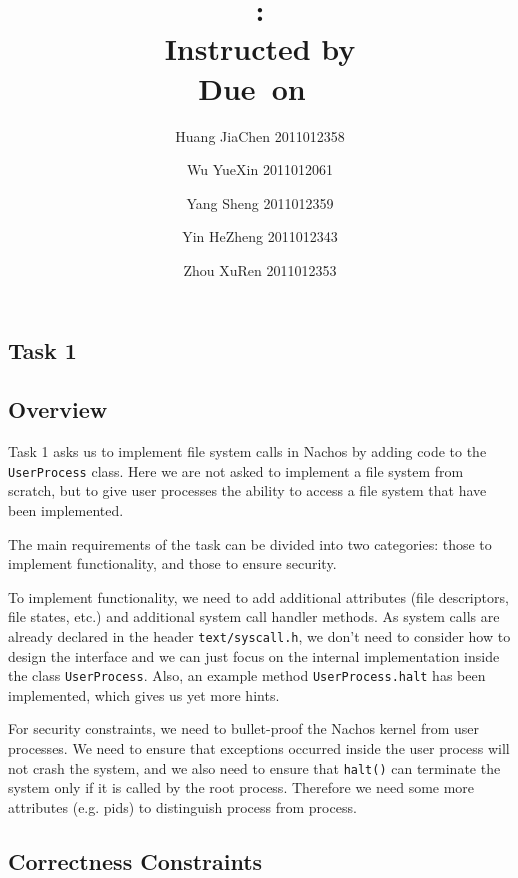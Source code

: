 \documentclass{article}
\title{\textmd{\bf \Class: \Title}\\{\large Instructed by \textit{\ClassInstructor}}\\\normalsize\vspace{0.1in}\small{Due\ on\ \DueDate}}
\date{}
\author{%
  Huang JiaChen 2011012358 \and
  Wu YueXin 2011012061 \and
  Yang Sheng 2011012359 \and
  Yin HeZheng 2011012343 \and
  Zhou XuRen 2011012353}
\begin{document}
  \begin{spacing}{1.1}
    \maketitle \thispagestyle{empty}



\section{Task 1}
\subsection{Overview}
Task 1 asks us to implement file system calls  in Nachos by adding code to the \texttt{UserProcess} class. Here we are not asked to implement a file system from scratch, but to give user processes the ability to access a file system that have been implemented.

The main requirements of the task can be divided into two categories: those to implement functionality, and those to ensure security.

To implement functionality, we need to add additional attributes (file descriptors, file states, etc.) and additional system call handler methods. As system calls are already declared in the header \texttt{text/syscall.h}, we don't need to consider how to design the interface and we can just focus on the internal implementation inside the class \texttt{UserProcess}. Also, an example method \texttt{UserProcess.halt} has been implemented, which gives us yet more hints.

For security constraints, we need to bullet-proof the Nachos kernel from user processes. We need to ensure that exceptions occurred inside the user process will not crash the system, and we also need to ensure that \texttt{halt()} can terminate the system only if it is called by the root process. Therefore we need some more attributes (e.g. pids) to distinguish process from process.

\subsection{Correctness Constraints}


\end{spacing}
\end{document}

